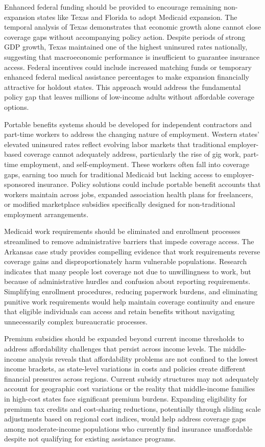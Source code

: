 \documentclass[
]{article}
\begin{document}
Enhanced federal funding should be provided to encourage remaining
non-expansion states like Texas and Florida to adopt Medicaid expansion.
The temporal analysis of Texas demonstrates that economic growth alone
cannot close coverage gaps without accompanying policy action. Despite
periods of strong GDP growth, Texas maintained one of the highest
uninsured rates nationally, suggesting that macroeconomic performance is
insufficient to guarantee insurance access. Federal incentives could
include increased matching funds or temporary enhanced federal medical
assistance percentages to make expansion financially attractive for
holdout states. This approach would address the fundamental policy gap
that leaves millions of low-income adults without affordable coverage
options.

Portable benefits systems should be developed for independent
contractors and part-time workers to address the changing nature of
employment. Western states' elevated uninsured rates reflect evolving
labor markets that traditional employer-based coverage cannot adequately
address, particularly the rise of gig work, part-time employment, and
self-employment. These workers often fall into coverage gaps, earning
too much for traditional Medicaid but lacking access to
employer-sponsored insurance. Policy solutions could include portable
benefit accounts that workers maintain across jobs, expanded association
health plans for freelancers, or modified marketplace subsidies
specifically designed for non-traditional employment arrangements.

Medicaid work requirements should be eliminated and enrollment processes
streamlined to remove administrative barriers that impede coverage
access. The Arkansas case study provides compelling evidence that work
requirements reverse coverage gains and disproportionately harm
vulnerable populations. Research indicates that many people lost
coverage not due to unwillingness to work, but because of administrative
hurdles and confusion about reporting requirements. Simplifying
enrollment procedures, reducing paperwork burdens, and eliminating
punitive work requirements would help maintain coverage continuity and
ensure that eligible individuals can access and retain benefits without
navigating unnecessarily complex bureaucratic processes.

Premium subsidies should be expanded beyond current income thresholds to
address affordability challenges that persist across income levels. The
middle-income analysis reveals that affordability problems are not
confined to the lowest income brackets, as state-level variations in
costs and policies create different financial pressures across regions.
Current subsidy structures may not adequately account for geographic
cost variations or the reality that middle-income families in high-cost
states face significant premium burdens. Expanding eligibility for
premium tax credits and cost-sharing reductions, potentially through
sliding scale adjustments based on regional cost indices, would help
address coverage gaps among moderate-income populations who currently
find insurance unaffordable despite not qualifying for existing
assistance programs.
\end{document}
